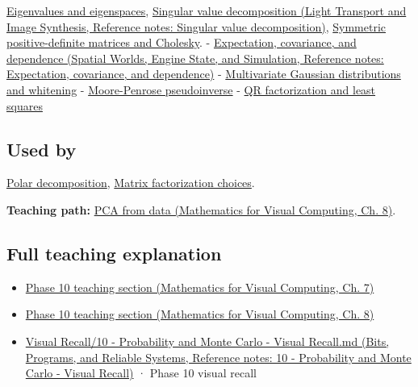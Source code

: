 \hyperref[appendix-0b3be18411f9]{Eigenvalues and eigenspaces}, \href{../04-Light-Transport-and-Image-Synthesis/main.pdf\#nameddest=appendix-1fad5e7f36fa}{Singular value decomposition (Light Transport and Image Synthesis, Reference notes: Singular value decomposition)}, \hyperref[appendix-50d2ea3c9b26]{Symmetric positive-definite matrices and Cholesky}. - \href{../05-Spatial-Worlds-Engine-State-and-Simulation/main.pdf\#nameddest=appendix-54c383df9992}{Expectation, covariance, and dependence (Spatial Worlds, Engine State, and Simulation, Reference notes: Expectation, covariance, and dependence)} - \hyperref[appendix-12bbe185dbe5]{Multivariate Gaussian distributions and whitening} - \hyperref[appendix-541306fdbc1b]{Moore-Penrose pseudoinverse} - \hyperref[appendix-c3421e6b4f2c]{QR factorization and least squares}

\subsection{Used by}\label{appendix-ad175ef3c5bf-used-by}

\hyperref[appendix-73f5bcf7a462]{Polar decomposition}, \hyperref[appendix-221a483bec2d]{Matrix factorization choices}.

\textbf{Teaching path:} \href{../02-Mathematics-for-Visual-Computing/main.pdf\#nameddest=02-foundations-ii-ch024-pca-turns-a-cloud-of-points-into-measured-variation}{PCA from data (Mathematics for Visual Computing, Ch. 8)}.

\subsection{Full teaching explanation}\label{appendix-ad175ef3c5bf-full-teaching-explanation}

\begin{itemize}
\tightlist
\item
  \href{../02-Mathematics-for-Visual-Computing/main.pdf\#nameddest=02-foundations-ii-ch023-expected-values-describe-centers-covariance-describes-dependence}{Phase 10 teaching section (Mathematics for Visual Computing, Ch. 7)}
\item
  \href{../02-Mathematics-for-Visual-Computing/main.pdf\#nameddest=02-foundations-ii-ch024-waiting-times-event-counts-and-covariance-geometry}{Phase 10 teaching section (Mathematics for Visual Computing, Ch. 8)}
\item
  \href{../01-Bits-Programs-and-Reliable-Systems/main.pdf\#nameddest=appendix-cb5af353ef77}{Visual Recall/10 - Probability and Monte Carlo - Visual Recall.md (Bits, Programs, and Reliable Systems, Reference notes: 10 - Probability and Monte Carlo - Visual Recall)} · Phase 10 visual recall
\end{itemize}
